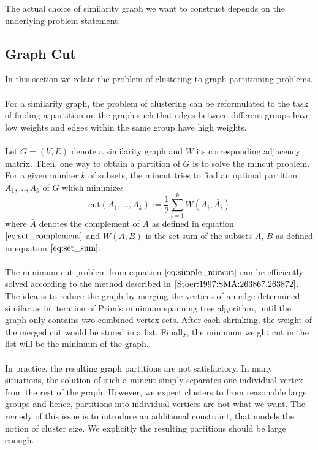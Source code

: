 The actual choice of similarity graph we want to construct depends on the underlying problem statement.

\subsection{Graph Cut}
\label{sec:graph_cut}
In this section we relate the problem of clustering to graph partitioning problems. \\ \\
For a similarity graph, the problem of clustering can be reformulated to the task of finding a partition on the graph such that edges between different groups have low weights and edges within the same group have high weights. \\ \\
Let $G = (V, E)$ denote a similarity graph and $W$ its corresponding adjacency matrix. Then, one way to obtain a partition of $G$ is to solve the mincut problem. For a given number $k$ of subsets, the mincut tries to find an optimal partition $A_1, \dots, A_k$ of $G$ which minimizes
\begin{equation}
\text{cut} \left( A_1, \dots, A_k \right) := \frac{1}{2} \sum_{i=1}^k W \left( A_i, \bar{A_i} \right)
\label{eq:simple_mincut} 
\end{equation}
where $\bar{A}$ denotes the complement of $A$ as defined in equation $\ref{eq:set_complement}$ and $W(A,B)$ is the set sum of the subsets $A$, $B$ as defined in equation $\ref{eq:set_sum}$. \\ \\
The minimum cut problem from equation $\ref{eq:simple_mincut}$ can be efficiently solved according to the method described in $\cite{Stoer:1997:SMA:263867.263872}$. The idea is to reduce the graph by merging the vertices of an edge determined similar as in iteration of Prim's minimum spanning tree algorithm, until the graph only contains two combined vertex sets. After each shrinking, the weight of the merged cut would be stored in a list. Finally, the minimum weight cut in the list will be the minimum of the graph. \\ \\
In practice, the resulting graph partitions are not satisfactory. In many situations, the solution of such a mincut simply separates one individual vertex from the rest of the graph. However, we expect clusters to from reasonable large groups and hence, partitions into individual vertices are not what we want. The remedy of this issue is to introduce an additional constraint, that models the notion of cluster size. We explicitly the resulting partitions should be large enough. 

